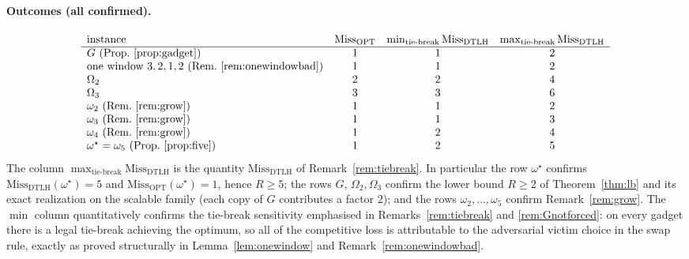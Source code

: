 \documentclass{amsart}
\theoremstyle{definition}
\begin{document}
\paragraph{Outcomes (all confirmed).}
\[
\begin{array}{lccc}
\text{instance} & \mathrm{Miss}_{\mathrm{OPT}} & \min_{\text{tie-break}}\mathrm{Miss}_{\mathrm{DTLH}} & \max_{\text{tie-break}}\mathrm{Miss}_{\mathrm{DTLH}}\\\hline
G\ (\text{Prop.~\ref{prop:gadget}}) & 1 & 1 & 2\\
\text{one window }3,2,1,2\ (\text{Rem.~\ref{rem:onewindowbad}}) & 1 & 1 & 2\\
\Omega_2 & 2 & 2 & 4\\
\Omega_3 & 3 & 3 & 6\\
\omega_2\ (\text{Rem.~\ref{rem:grow}}) & 1 & 1 & 2\\
\omega_3\ (\text{Rem.~\ref{rem:grow}}) & 1 & 1 & 3\\
\omega_4\ (\text{Rem.~\ref{rem:grow}}) & 1 & 2 & 4\\
\omega^\star=\omega_5\ (\text{Prop.~\ref{prop:five}}) & 1 & 2 & 5
\end{array}
\]
The column $\max_{\text{tie-break}}\mathrm{Miss}_{\mathrm{DTLH}}$ is the quantity
$\mathrm{Miss}_{\mathrm{DTLH}}$ of Remark~\ref{rem:tiebreak}. In particular the
row $\omega^\star$ confirms $\mathrm{Miss}_{\mathrm{DTLH}}(\omega^\star)=5$ and
$\mathrm{Miss}_{\mathrm{OPT}}(\omega^\star)=1$, hence $R\ge5$; the rows $G$,
$\Omega_2,\Omega_3$ confirm the lower bound $R\ge2$ of Theorem~\ref{thm:lb} and
its exact realization on the scalable family (each copy of $G$ contributes a
factor $2$); and the rows $\omega_2,\dots,\omega_5$ confirm
Remark~\ref{rem:grow}. The $\min$ column quantitatively confirms the tie-break
sensitivity emphasised in Remarks~\ref{rem:tiebreak} and \ref{rem:Gnotforced}:
on every gadget there is a legal tie-break achieving the optimum, so all of the
competitive loss is attributable to the adversarial victim choice in the swap
rule, exactly as proved structurally in Lemma~\ref{lem:onewindow} and
Remark~\ref{rem:onewindowbad}.
\end{document}
